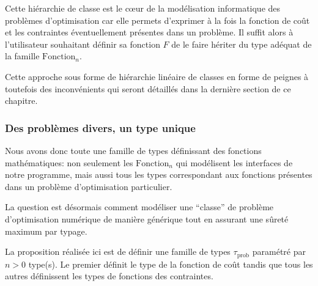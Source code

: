 Cette hiérarchie de classe est le c\oe ur de la modélisation
informatique des problèmes d'optimisation car elle permets d'exprimer
à la fois la fonction de coût et les contraintes éventuellement
présentes dans un problème. Il suffit alors à l'utilisateur souhaitant
définir sa fonction $F$ de le faire hériter du type adéquat de la
famille $\text{Fonction}_n$.

Cette approche sous forme de hiérarchie linéaire de classes en forme
de peignes à toutefois des inconvénients qui seront détaillés dans la
dernière section de ce chapitre.


\subsubsection{Des problèmes divers, un type unique}


Nous avons donc toute une famille de types définissant des fonctions
mathématiques: non seulement les $\text{Fonction}_n$ qui modélisent
les interfaces de notre programme, mais aussi tous les types
correspondant aux fonctions présentes dans un problème d'optimisation
particulier.

La question est désormais comment modéliser une ``classe'' de problème
d'optimisation numérique de manière générique tout en assurant une
sûreté maximum par typage.

La proposition réalisée ici est de définir une famille de types
$\tau_{\text{prob}}$ paramétré par $n > 0$ type(s). Le premier définit
le type de la fonction de coût tandis que tous les autres définissent
les types de fonctions des contraintes.


